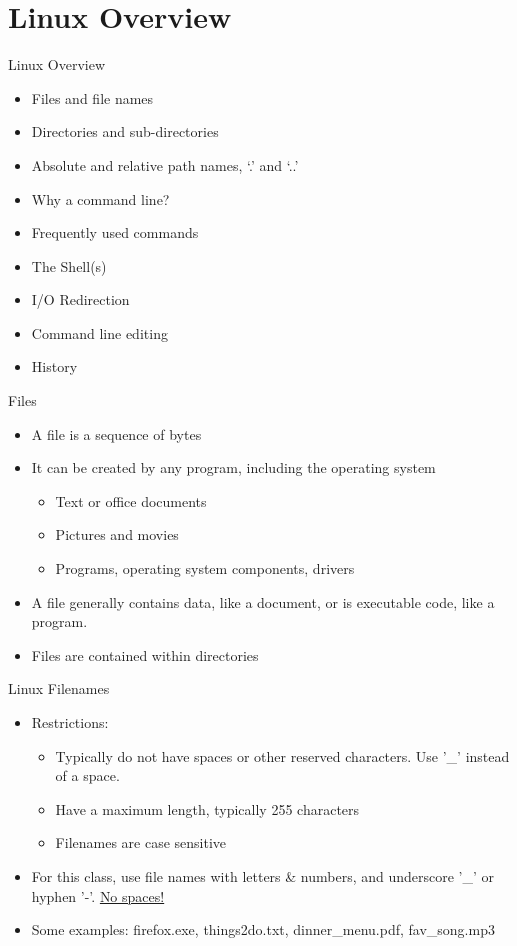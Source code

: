 \documentclass[graphics]{beamer}
\begin{document}
\section{Linux Overview}
\begin{frame}{Linux Overview}
    \begin{itemize}
        \item Files and file names
        \item Directories and sub-directories
        \item Absolute and relative path names, `.' and `..'
        \item Why a command line?
        \item Frequently used commands
        \item The Shell(s)
        \item I/O Redirection
        \item Command line editing
        \item History
    \end{itemize}
\end{frame}

\begin{frame}{Files}
    \begin{itemize}
        \item A file is a sequence of bytes
        \item It can be created by any program, including the operating system
        \begin{itemize}
            \item Text or office documents
            \item Pictures and movies
            \item Programs, operating system components, drivers
        \end{itemize}
        \item A file generally contains data, like a document, or is executable code, like a program.
        \item Files are contained within directories
    \end{itemize}
\end{frame}

\begin{frame}{Linux Filenames}
    \begin{itemize}
        \item Restrictions:
        \begin{itemize}
            \item Typically do not have spaces or other reserved characters. Use '\_' instead of a space.
            \item Have a maximum length, typically 255 characters
            \item Filenames are case sensitive
        \end{itemize}
        \item For this class, use file names with letters \& numbers, and underscore '\_' or hyphen '-'. \underline{No spaces!}
        \item Some examples: firefox.exe, things2do.txt, dinner\_menu.pdf, fav\_song.mp3
    \end{itemize}
\end{frame}
\end{document}
